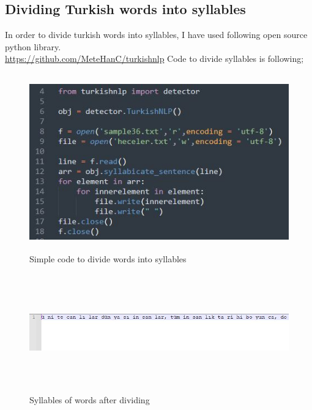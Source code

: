\documentclass{article}
\begin{document}
\subsection{Dividing Turkish words into syllables}
In order to divide turkish words into syllables, I have used following open source python library. \\
\newline
\url{https://github.com/MeteHanC/turkishnlp}
\newline
\newline
\newline
Code to divide syllables is following;
\begin{figure}[H]
    \centering
	\includegraphics[width=6in, height=3in]{6.JPG}
	\caption[Optional caption]{Simple code to divide words into syllables}
	\label{}
\end{figure}
\begin{figure}[H]
    \centering
	\includegraphics[width=5in, height=2in]{7.JPG}
	\caption[Optional caption]{Syllables of words after dividing}
	\label{}
\end{figure}
\end{document}
